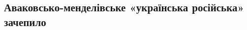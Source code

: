  
 
 
 
 

\subsection{Аваковсько-менделівське «українська російська» зачепило}
\label{sec:06_04_2021.fb.promovugroup.2.mova}

